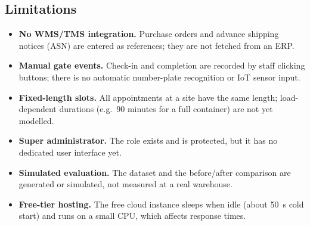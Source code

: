 \subsection*{Limitations}
\begin{itemize}
  \item \textbf{No WMS/TMS integration.} Purchase orders and advance shipping notices (ASN) are entered as references; they are not fetched from an ERP.
  \item \textbf{Manual gate events.} Check-in and completion are recorded by staff clicking buttons; there is no automatic number-plate recognition or IoT sensor input.
  \item \textbf{Fixed-length slots.} All appointments at a site have the same length; load-dependent durations (e.g.\ 90 minutes for a full container) are not yet modelled.
  \item \textbf{Super administrator.} The role exists and is protected, but it has no dedicated user interface yet.
  \item \textbf{Simulated evaluation.} The dataset and the before/after comparison are generated or simulated, not measured at a real warehouse.
  \item \textbf{Free-tier hosting.} The free cloud instance sleeps when idle (about 50~s cold start) and runs on a small CPU, which affects response times.
\end{itemize}
